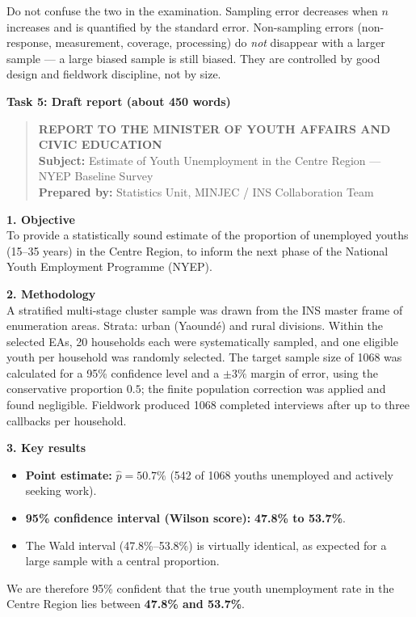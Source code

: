 \documentclass[11pt]{article}
\newcommand{\cle}[1]{{\popxbold\color{popdark}#1}}
\begin{document}
\begin{attention}
Do not confuse the two in the examination. \cle{Sampling error} decreases when $n$ increases and is quantified by the standard error. \cle{Non-sampling errors} (non-response, measurement, coverage, processing) do \emph{not} disappear with a larger sample --- a large biased sample is still biased. They are controlled by good design and fieldwork discipline, not by size.
\end{attention}

\textbf{Task 5: Draft report (about 450 words)}

\begin{quote}
\textbf{REPORT TO THE MINISTER OF YOUTH AFFAIRS AND CIVIC EDUCATION}\\
\textbf{Subject:} Estimate of Youth Unemployment in the Centre Region --- NYEP Baseline Survey\\
\textbf{Prepared by:} Statistics Unit, MINJEC / INS Collaboration Team
\end{quote}

\textbf{1. Objective}\\
To provide a statistically sound estimate of the proportion of unemployed youths (15--35 years) in the Centre Region, to inform the next phase of the National Youth Employment Programme (NYEP).

\textbf{2. Methodology}\\
A stratified multi-stage cluster sample was drawn from the INS master frame of enumeration areas. Strata: urban (Yaound\'e) and rural divisions. Within the selected EAs, 20 households each were systematically sampled, and one eligible youth per household was randomly selected. The target sample size of 1068 was calculated for a 95\% confidence level and a $\pm 3\%$ margin of error, using the conservative proportion $0.5$; the finite population correction was applied and found negligible. Fieldwork produced 1068 completed interviews after up to three callbacks per household.

\textbf{3. Key results}
\begin{itemize}
    \item \textbf{Point estimate:} $\hat{p} = 50.7\%$ (542 of 1068 youths unemployed and actively seeking work).
    \item \textbf{95\% confidence interval (Wilson score):} \textbf{47.8\% to 53.7\%}.
    \item The Wald interval (47.8\%--53.8\%) is virtually identical, as expected for a large sample with a central proportion.
\end{itemize}
We are therefore 95\% confident that the true youth unemployment rate in the Centre Region lies between \textbf{47.8\% and 53.7\%}.
\end{document}
